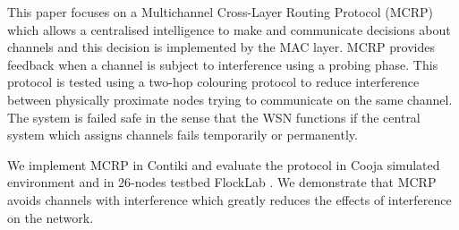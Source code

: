 This paper focuses on a Multichannel Cross-Layer Routing Protocol (MCRP) which allows a centralised intelligence to make and communicate decisions about channels and this decision is implemented by the MAC layer. MCRP provides feedback when a channel is subject to interference using a probing phase. This protocol is tested using a two-hop colouring protocol to reduce interference between physically proximate nodes trying to communicate on the same channel. The system is failed safe in the sense that the WSN functions if the central system which assigns channels fails temporarily or permanently.

We implement MCRP in Contiki and evaluate the protocol in Cooja simulated environment and in 26-nodes testbed FlockLab \cite{flocklab}. We demonstrate that MCRP avoids channels with interference which greatly reduces the effects of interference on the network.





